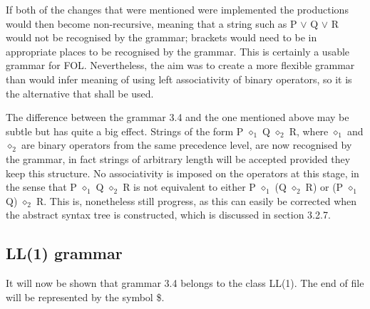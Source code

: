 If both of the changes that were mentioned were implemented the productions would then become non-recursive, meaning that a string such as P $\lor$ Q $\lor$ R would not be recognised by the grammar; brackets would need to be in appropriate places to be recognised by the grammar. This is certainly a usable grammar for FOL. Nevertheless, the aim was to create a more flexible grammar than would infer meaning of using left associativity of binary operators, so it is the alternative that shall be used.

The difference between the grammar 3.4 and the one mentioned above may be subtle but has quite a big effect. Strings of the form P $\diamond_1$ Q $\diamond_2$ R, where $\diamond_1$ and $\diamond_2$ are binary operators from the same precedence level, are now recognised by the grammar, in fact strings of arbitrary length will be accepted provided they keep this structure. No associativity is imposed on the operators at this stage, in the sense that P $\diamond_1$ Q $\diamond_2$ R is not equivalent to either P $\diamond_1$ (Q $\diamond_2$ R) or (P $\diamond_1$ Q) $\diamond_2$ R. This is, nonetheless still progress, as this can easily be corrected when the abstract syntax tree is constructed, which is discussed in section 3.2.7.

\subsection{LL(1) grammar}

It will now be shown that grammar 3.4  belongs to the class LL(1). The end of file will be represented by the symbol \$.

